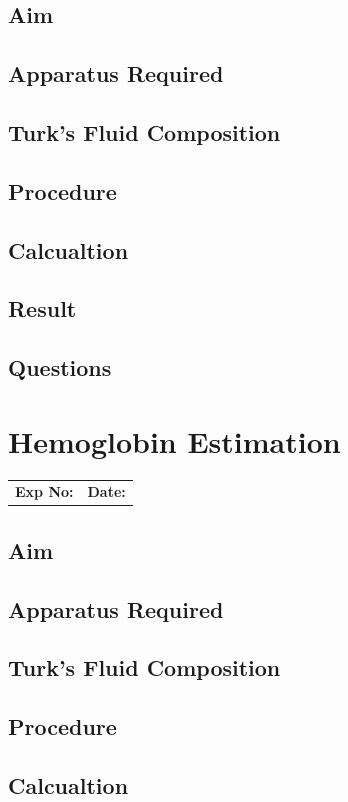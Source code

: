 \documentclass[a4paper,12pt]{book}
\begin{document}
	\section*{Aim}
	\section*{Apparatus Required}
	\section*{Turk's Fluid Composition}
	\section*{Procedure}
	\section*{Calcualtion}
	\section*{Result}
	\section*{Questions}

\chapter*{\centering Hemoglobin Estimation}
		\begin{tabular}{p{5in} p{1in}}
			\textbf{Exp No:}  & \textbf{Date:}\\
		\end{tabular}

	\section*{Aim}
	\section*{Apparatus Required}
	\section*{Turk's Fluid Composition}
	\section*{Procedure}
	\section*{Calcualtion}
\end{document}
